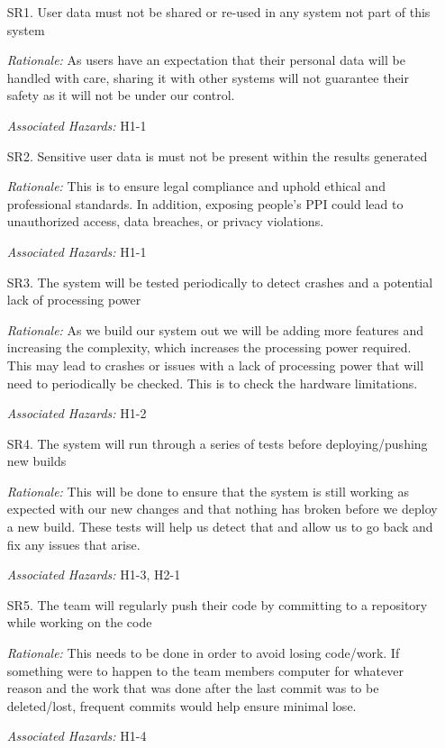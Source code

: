 \documentclass{article}
\begin{document}
\begin{enumerate}

    \item[SR1.] User data must not be shared or re-used in any system not part of this system
    \item[] \emph{Rationale:}  As users have an expectation that their personal data will be handled with care, sharing it with other systems will not guarantee their safety as it will not be under our control.
    \item[] \emph{Associated Hazards:} H1-1\\

    \item[SR2.] Sensitive user data is must not be present within the results generated
    \item[] \emph{Rationale:}  This is to ensure legal compliance and uphold ethical and professional standards. In addition, exposing people's PPI could lead to unauthorized access, data breaches, or privacy violations.
    \item[] \emph{Associated Hazards:} H1-1\\
    
    \item[SR3.] The system will be tested periodically to detect crashes and a potential lack of processing power
    \item[] \emph{Rationale:} As we build our system out we will be adding more features and increasing the complexity, which increases the processing power required. This may lead to crashes or issues with a lack of processing power that will need to periodically be checked. This is to check the hardware limitations.
    \item[] \emph{Associated Hazards:} H1-2\\

    \item[SR4.] The system will run through a series of tests before deploying/pushing new builds
    \item[] \emph{Rationale:} This will be done to ensure that the system is still working as expected with our new changes and that nothing has broken before we deploy a new build. These tests will help us detect that and allow us to go back and fix any issues that arise. 
    \item[] \emph{Associated Hazards:} H1-3, H2-1  \\

    \item[SR5.] The team will regularly push their code by committing to a repository while working on the code
    \item[] \emph{Rationale:} This needs to be done in order to avoid losing code/work. If something were to happen to the team members computer for whatever reason and the work that was done after the last commit was to be deleted/lost, frequent commits would help ensure minimal lose.
    \item[] \emph{Associated Hazards:} H1-4 \\
    

\end{enumerate}
\end{document}
